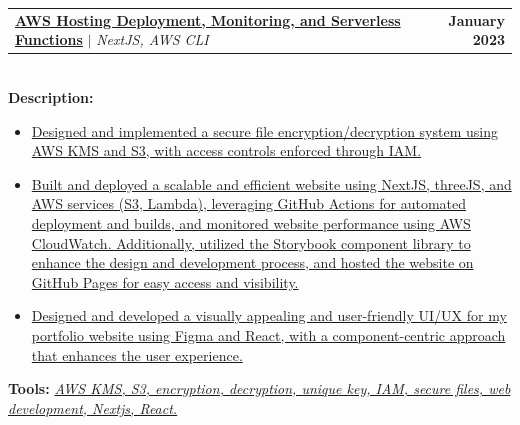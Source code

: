 \documentclass[letterpaper,11pt]{article}
\makeatletter
\newcommand{\resumeItem}[1]{
  \item\small{
    {#1 \vspace{-2pt}}
  }
}
\newcommand{\resumeProjectHeading}[2]{
    \item
    \begin{tabular*}{1.001\textwidth}{l@{\extracolsep{\fill}}r}
      \small#1 & \textbf{\small #2}\\
    \end{tabular*}\vspace{-7pt}
}
\newcommand{\resumeItemListStart}{\begin{itemize}}
\newcommand{\resumeItemListEnd}{\end{itemize}\vspace{-5pt}}
\makeatother
\begin{document}
          \resumeProjectHeading
          {\href{https://yakkshit.com}{\textbf{AWS Hosting Deployment, Monitoring, and Serverless Functions}} $|$ \emph{NextJS, AWS CLI} \faGithub}{January 2023}\\
          \vspace{6pt}
          \textbf{Description:} 
          \vspace{-5pt}
          \resumeItemListStart
            \resumeItem{\href{https://yakkshit.com}{Designed and implemented a secure file encryption/decryption system using AWS KMS and S3, with access controls enforced through IAM.}}
            \resumeItem{\href{https://yakkshit.com}{Built and deployed a scalable and efficient website using NextJS, threeJS, and AWS services (S3, Lambda), leveraging GitHub Actions for automated deployment and builds, and monitored website performance using AWS CloudWatch. Additionally, utilized the Storybook component library to enhance the design and development process, and hosted the website on GitHub Pages for easy access and visibility.}}
            \resumeItem{\href{https://yakkshit.com}{Designed and developed a visually appealing and user-friendly UI/UX for my portfolio website using Figma and React, with a component-centric approach that enhances the user experience.}}
          \resumeItemListEnd
          \vspace{-2pt}
          \textbf{Tools:}\emph{ \href{https://yakkshit.com}{AWS KMS, S3, encryption, decryption, unique key, IAM, secure files, web development, Nextjs, React.}}
    \vspace{-22pt}


                
                            
\end{document}
